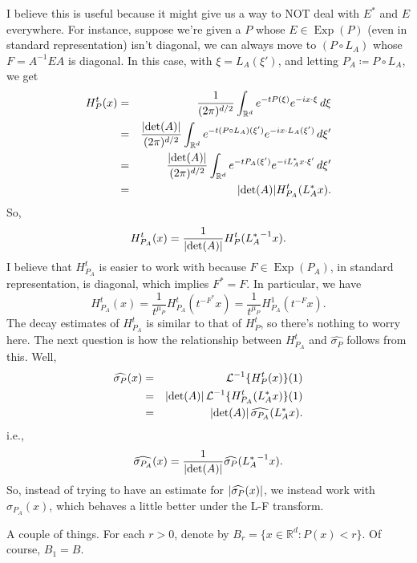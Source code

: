 \documentclass[11pt]{article}
\newcommand\Exp{\operatorname{Exp}}
\renewcommand\det{\operatorname{det}}
\newcommand{\lp}{\left(}
\newcommand{\rp}{\right)}
\newcommand{\f}[2]{\frac{#1}{#2}}
\newcommand{\LT}{\mathcal{L}}
\begin{document}
I believe this is useful because it might give us a way to NOT deal with $E^*$ and $E$ everywhere. For instance, suppose we're given a $P$ whose $E\in \Exp(P)$ (even in standard representation) isn't diagonal, we can always move to $(P\circ L_A)$ whose $F = A^{-1}EA$ is diagonal. In this case, with $\xi = L_A(\xi')$, and letting $P_A \coloneqq P \circ L_A$, we get
\begin{eqnarray*}
    H_P^t(x) 
    &=& \frac{1}{(2\pi)^{d/2}}\int_{\mathbb{R}^d}e^{-tP(\xi)}e^{-ix\cdot \xi}\,d\xi \\
    &=& \frac{\abs{\det(A)}}{(2\pi)^{d/2}}\int_{\mathbb{R}^d}e^{-t(P\circ L_A)(\xi')}e^{-ix\cdot L_A(\xi')}\,d\xi' \\
    &=& \frac{\abs{\det(A)}}{(2\pi)^{d/2}}\int_{\mathbb{R}^d}e^{-tP_A(\xi')}e^{-iL_A^*x\cdot \xi'}\,d\xi' \\
    &=& \abs{\det(A)}H_{P_A}^{t}(L_A^* x).
\end{eqnarray*}
So,
\begin{equation*}
    H_{P_A}^t(x) = \f{1}{\abs{\det(A)}}H_P^t({L_A^*}^{-1}x).
\end{equation*}
I believe that $H_{P_A}^{t}$ is easier to work with because $F\in \Exp(P_A)$, in standard representation, is diagonal, which implies $F^* = F$.  In particular, we have 
\begin{equation*}
    H_{P_A}^t(x) = \f{1}{t^{\mu_P}} H_{P_A}^t\lp t^{-F^*} x\rp = \f{1}{t^{\mu_P}} H_{P_A}^1\lp t^{-F} x\rp.
\end{equation*}
The decay estimates of $H_{P_A}^t$ is similar to that of $H_P^t$, so there's nothing to worry here. The next question is how the relationship between $H_{P_A}^t$ and $\widehat{\sigma_P}$ follows from this. Well,
\begin{eqnarray*}
    \widehat{\sigma_P}(x) 
    &=& \LT^{-1}\{ H_P^t(x) \}(1) \\
    &=& \abs{\det(A)}\,\LT^{-1}\{  H_{P_A}^t( L_A^* x) \}(1) \\
    &=& \abs{\det(A)} \,\widehat{\sigma_{P_A}}(L_A^* x).
\end{eqnarray*}
i.e.,
\begin{equation}\label{eq:SigmaAndA}
    \widehat{\sigma_{P_A}}(x) = \f{1}{\abs{\det(A)}} \widehat{\sigma_P}({L_A^*}^{-1}x).
\end{equation}
So, instead of trying to have an estimate for $\abs{\widehat{\sigma_P}(x)}$, we instead work with $\sigma_{P_A}(x)$, which behaves a little better under the L-F transform.


A couple of things. For each $r>0$, denote by $B_r=\{x\in\mathbb{R}^d:P(x)<r\}$. Of course, $B_1=B$. 
\end{document}
